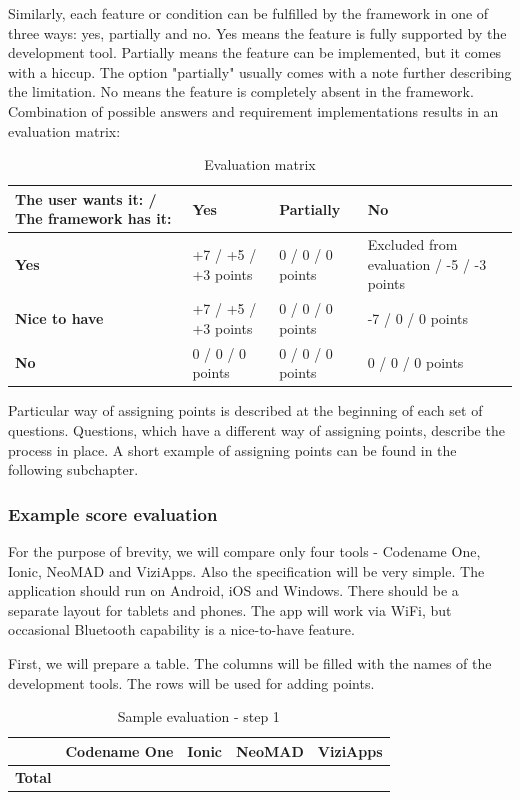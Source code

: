 \documentclass[english,master,public,dept460,male,cpdeclaration,oneside]{diploma}
\begin{document}
Similarly, each feature or condition can be fulfilled by the framework in one of three ways: yes, partially and no. Yes means the feature is fully supported by the development tool. Partially means the feature can be implemented, but it comes with a hiccup. The option "partially" usually comes with a note further describing the limitation. No means the feature is completely absent in the framework. Combination of possible answers and requirement implementations results in an evaluation matrix:
	
\begin{table}[!h]
	\centering
	\caption{Evaluation matrix}
	\begin{tabular}{p{3cm} | p{3cm} | p{3cm} | p{3cm}}
		\toprule
		\textbf{The user wants it: / The framework has it:} & \textbf{Yes} & \textbf{Partially} & \textbf{No} \\
		\midrule
		\textbf{Yes} & +7 / +5 / +3 points & 0 / 0 / 0 points & Excluded from evaluation / -5 / -3 points \\
		\midrule
		\textbf{Nice to have} & +7 / +5 / +3 points & 0 / 0 / 0 points & -7 / 0 / 0 points \\
		\midrule
		\textbf{No} & 0 / 0 / 0 points & 0 / 0 / 0 points &  0 / 0 / 0 points \\
		\midrule	
	\end{tabular}
\end{table}

Particular way of assigning points is described at the beginning of each set of questions. Questions, which have a different way of assigning points, describe the process in place. A short example of assigning points can be found in the following subchapter.

\subsubsection{Example score evaluation}
For the purpose of brevity, we will compare only four tools - Codename One, Ionic, NeoMAD and ViziApps. Also the specification will be very simple. The application should run on Android, iOS and Windows. There should be a separate layout for tablets and phones. The app will work via WiFi, but occasional Bluetooth capability is a nice-to-have feature.

First, we will prepare a table. The columns will be filled with the names of the development tools. The rows will be used for adding points.

\begin{table}[!h]
	\centering
	\caption{Sample evaluation - step 1}
	\begin{tabular}{p{2.5cm} | p{2.5cm} | p{2.5cm} | p{2.5cm} | p{2.5cm}}
		\toprule
		& \textbf{Codename One} & \textbf{Ionic} & \textbf{NeoMAD} & \textbf{ViziApps} \\
		\midrule
		\textbf{Total} &&&& \\
		\midrule
	\end{tabular}
\end{table}
	
\end{document}
